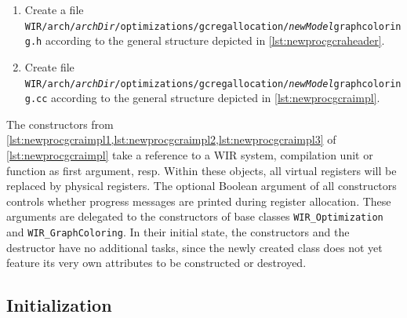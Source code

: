 \begin{enumerate}
\begin{lstlisting}[style=code,float=!ht,xleftmargin=10mm,aboveskip=-0.8 \baselineskip,belowskip=-0.8 \baselineskip]
Ü{\itshape archDir}Ügcraincludedir      = ${includedir}/arch/Ü{\itshape archDir}Ü/optimizations/gcregallocation
Ü{\itshape archDir}Ügcrainclude_HEADERS = arch/Ü{\itshape archDir}Ü/optimizations/gcregallocation/Ü{\itshape newModel}Ügraphcoloring.h
\end{lstlisting}

  \item Create a file \texttt{WIR/arch/{\itshape archDir}/optimizations/gcregallocation/{\itshape newModel}graphcoloring.h} according to the general structure depicted in \cref{lst:newprocgcraheader}.

  \item Create file \texttt{WIR/arch/{\itshape archDir}/optimizations/gcregallocation/{\itshape newModel}graphcoloring.cc} according to the general structure depicted in \cref{lst:newprocgcraimpl}.
\end{enumerate}

The constructors from \cref{lst:newprocgcraimpl1,lst:newprocgcraimpl2,lst:newprocgcraimpl3} of \cref{lst:newprocgcraimpl} take a reference to a \gls{WIR} system, compilation unit or function as first argument, resp.
Within these objects, all virtual registers will be replaced by physical registers.
The optional Boolean argument of all constructors controls whether progress messages are printed during register allocation.
These arguments are delegated to the constructors of base classes \texttt{WIR\_Optimization} and \texttt{WIR\_GraphColoring}.
In their initial state, the constructors and the destructor have no additional tasks, since the newly created class does not yet feature its very own attributes to be constructed or destroyed.


\subsection{Initialization}
\label{ssec:gcinit}

